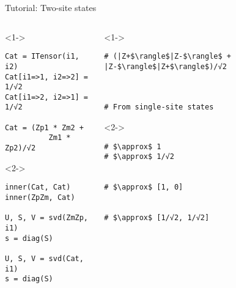 \begin{frame}[fragile]{Tutorial: Two-site states}


\begin{columns}

\begin{column}{5cm}

\begin{onlyenv}<1->

\begin{lstlisting}[language=JuliaLocal, style=julia, basicstyle=\small]
Cat = ITensor(i1, i2)
Cat[i1=>1, i2=>2] = 1/√2
Cat[i1=>2, i2=>1] = 1/√2

Cat = (Zp1 * Zm2 +
          Zm1 * Zp2)/√2
\end{lstlisting}

\end{onlyenv}

\begin{onlyenv}<2->

\begin{lstlisting}[language=JuliaLocal, style=julia, basicstyle=\small]
inner(Cat, Cat)
inner(ZpZm, Cat)

U, S, V = svd(ZmZp, i1)
s = diag(S)

U, S, V = svd(Cat, i1)
s = diag(S)
\end{lstlisting}

\end{onlyenv}

\end{column}

\begin{column}{5cm}

\begin{onlyenv}<1->

\begin{lstlisting}[style=julia, numbers=none, mathescape, basicstyle=\small]
# (|Z+$\rangle$|Z-$\rangle$ + |Z-$\rangle$|Z+$\rangle$)/√2



# From single-site states
 \end{lstlisting}

\end{onlyenv}

\begin{onlyenv}<2->

\begin{lstlisting}[style=julia, numbers=none, mathescape, basicstyle=\small]
# $\approx$ 1
# $\approx$ 1/√2


# $\approx$ [1, 0]


# $\approx$ [1/√2, 1/√2]
\end{lstlisting}

\end{onlyenv}

\end{column}

\end{columns}

\end{frame}
